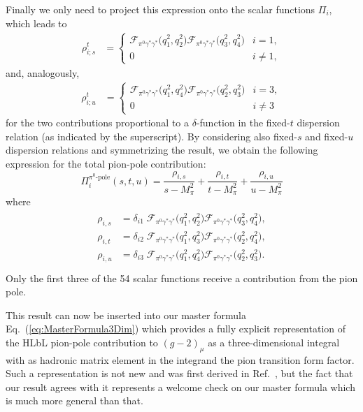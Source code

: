\documentclass[epj]{webofc}
\newcommand{\<}{\langle}
\renewcommand{\>}{\rangle}
\begin{document}
Finally we only need to project this expression onto the scalar functions
$\Pi_i$, which leads to
\begin{align}
	\rho_{i;s}^t &= \left\{ \begin{matrix} \mathcal{F}_{\pi^0\gamma^*\gamma^*}\big(q_1^2,q_2^2\big) \mathcal{F}_{\pi^0\gamma^*\gamma^*}\big(q_3^2,q_4^2\big) & i = 1 , \\
									0 & i \neq 1 , \end{matrix} \right.
\end{align}
and, analogously,
\begin{align}
	\rho_{i;u}^t &= \left\{ \begin{matrix} \mathcal{F}_{\pi^0\gamma^*\gamma^*}\big(q_1^2,q_4^2\big) \mathcal{F}_{\pi^0\gamma^*\gamma^*}\big(q_2^2,q_3^2\big) & i = 3 , \\
									0 & i \neq 3  \end{matrix} \right.
\end{align}
for the two contributions proportional to a $\delta$-function in the
fixed-$t$ dispersion relation (as indicated by the superscript). By
considering also fixed-$s$ and fixed-$u$ dispersion relations and
symmetrizing the result, we obtain the following expression for the total
pion-pole contribution:
\begin{equation}
\Pi_i^{\pi^0\text{-pole}}(s,t,u) =
  \frac{\rho_{i,s}}{s-M_\pi^2} + \frac{\rho_{i,t}}{t-M_\pi^2} +
  \frac{\rho_{i,u}}{u-M_\pi^2}
\end{equation}
where
  \begin{align}
	\begin{split}
		\rho_{i,s} &= \delta_{i1} \; \mathcal{F}_{\pi^0\gamma^*\gamma^*}\big(q_1^2,q_2^2\big) \mathcal{F}_{\pi^0\gamma^*\gamma^*}\big(q_3^2,q_4^2\big) , \\
		\rho_{i,t} &= \delta_{i2} \;
                \mathcal{F}_{\pi^0\gamma^*\gamma^*}\big(q_1^2,q_3^2\big)
                \mathcal{F}_{\pi^0\gamma^*\gamma^*}\big(q_2^2,q_4^2\big) ,
                \\
		\rho_{i,u} &= \delta_{i3} \; \mathcal{F}_{\pi^0\gamma^*\gamma^*}\big(q_1^2,q_4^2\big) \mathcal{F}_{\pi^0\gamma^*\gamma^*}\big(q_2^2,q_3^2\big) . \\
	\end{split}
\nonumber
\end{align}
Only the first three of the 54 scalar functions receive a contribution from
the pion pole. 

This result can now be inserted into our master formula
Eq.~(\ref{eq:MasterFormula3Dim}) which provides a fully explicit
representation of the HLbL pion-pole contribution to $(g-2)_\mu$ as a
three-dimensional integral with as hadronic matrix element in the integrand
the pion transition form factor. Such a representation is not new and was
first derived in Ref.~\cite{Knecht:2001qf}, but the fact that our result
agrees with it represents a welcome check on our master formula which is
much more general than that. 
\end{document}
